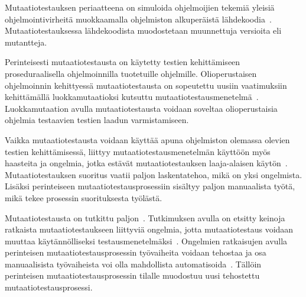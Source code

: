 \documentclass[finnish, grading]{tktltiki2}
\theoremstyle{definition}
\theoremstyle{remark}
\begin{document}
Mutaatiotestauksen periaatteena on simuloida ohjelmoijien tekemiä yleisiä ohjelmointivirheitä muokkaamalla ohjelmiston alkuperäistä lähdekoodia~\cite[s. 649]{Jia:Harman:2011}. Mutaatiotestauksessa lähdekoodista muodostetaan muunnettuja versioita eli mutantteja. 

Perinteisesti mutaatiotestausta on käytetty testien kehittämiseen proseduraalisella ohjelmoinnilla tuotetuille ohjelmille. Olioperustaisen ohjelmoinnin kehittyessä mutaatiotestausta on sopeutettu uusiin vaatimuksiin kehittämällä luokkamutaatioksi kutsuttu mutaatiotestausmenetelmä~\cite{Kim:Clark:McDermid:2000}. Luokkamutaation avulla mutaatiotestausta voidaan soveltaa olioperustaisia ohjelmia testaavien testien laadun varmistamiseen.

Vaikka mutaatiotestausta voidaan käyttää apuna ohjelmiston olemassa olevien testien kehittämisessä, liittyy mutaatiotestausmenetelmän käyttöön myös haasteita ja ongelmia, jotka estävät mutaatiotestauksen laaja-alaisen käytön~\cite[s. 652]{Jia:Harman:2011}. Mutaatiotestauksen suoritus vaatii paljon laskentatehoa, mikä on yksi ongelmista. Lisäksi perinteiseen mutaatiotestausprosessiin sisältyy paljon manuaalista työtä, mikä tekee prosessin suorituksesta työlästä. 

Mutaatiotestausta on tutkittu paljon~\cite[s. 649]{Jia:Harman:2011}. Tutkimuksen avulla on etsitty keinoja ratkaista mutaatiotestaukseen liittyviä ongelmia, jotta mutaatiotestaus voidaan muuttaa käytännölliseksi testausmenetelmäksi~\cite[s. 649, 652-653]{Jia:Harman:2011}. Ongelmien ratkaisujen avulla perinteisen mutaatiotestausprosessin työvaiheita voidaan tehostaa ja osa manuaalisista työvaiheista voi olla mahdollista automatisoida~\cite[s. 41]{Offutt:Untch:2001}. Tällöin perinteisen mutaatiotestausprosessin tilalle muodostuu uusi tehostettu mutaatiotestausprosessi.

%
%
%
\end{document}
